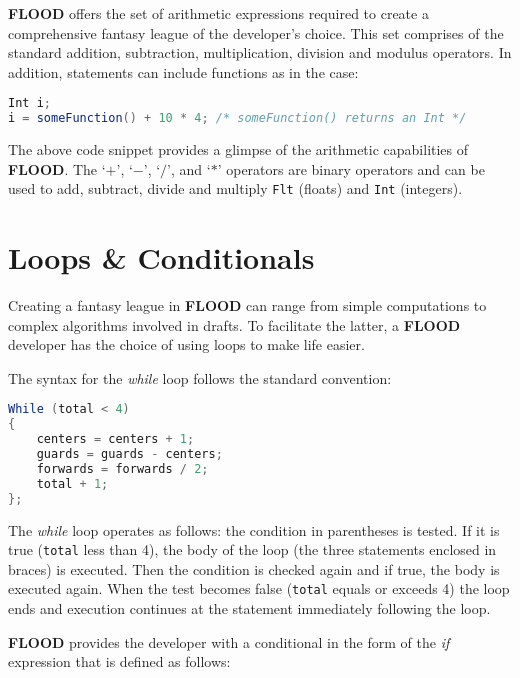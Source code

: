 \documentclass[12pt]{report}
\begin{document}
\textbf{FLOOD} offers the set of arithmetic expressions required to create a comprehensive fantasy league of the developer's choice. This set comprises of the standard addition, subtraction, multiplication, division and modulus operators. In addition, statements can include functions as in the case:

\begin{singlespace}
\begin{lstlisting}[language=Java,label=some-code,caption=Function used in an arithmetic statement]
Int i;
i = someFunction() + 10 * 4; /* someFunction() returns an Int */
\end{lstlisting}
\end{singlespace}

The above code snippet provides a glimpse of the arithmetic capabilities of \textbf{FLOOD}. The `$+$', `$-$', `$/$', and `$*$' operators are binary operators and can be used to add, subtract, divide and multiply \texttt{Flt} (floats) and \texttt{Int} (integers).

\section{Loops \& Conditionals}

Creating a fantasy league in \textbf{FLOOD} can range from simple computations to complex algorithms involved in drafts. To facilitate the latter, a \textbf{FLOOD} developer has the choice of using loops to make life easier.

The syntax for the \textit{while} loop follows the standard convention:

\begin{singlespace}
\begin{lstlisting}[language=Java,label=some-code,caption=while loop]
While (total < 4)
{
	centers = centers + 1;
	guards = guards - centers;
	forwards = forwards / 2;
	total + 1;
};
\end{lstlisting}
\end{singlespace}

The \textit{while} loop operates as follows: the condition in parentheses is tested. If it is true (\texttt{total} less than 4), the body of the loop (the three statements enclosed in braces) is executed. Then the condition is checked again and if true, the body is executed again. When the test becomes false (\texttt{total} equals or exceeds 4) the loop ends and execution continues at the statement immediately following the loop. 

\textbf{FLOOD} provides the developer with a conditional in the form of the \textit{if} expression that is defined as follows:
\end{document}
